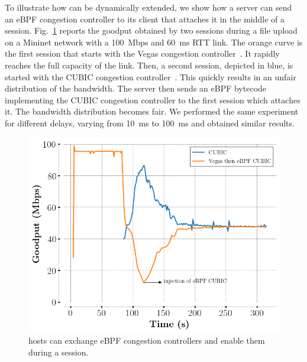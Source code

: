 To illustrate how \tcpls can be dynamically extended, we show how a server can
send an eBPF congestion controller to its client that attaches it in the middle
of a \tcpls session. Fig.~\ref{fig:vegasCubic} reports the goodput obtained
by two \tcpls sessions during a file upload on a Mininet network with a
100~Mbps and 60~ms RTT link.
The orange curve is the first \tcpls session that starts with the Vegas
congestion controller~\cite{brakmo1994tcp}. It rapidly reaches the full capacity of the link. Then, a second \tcpls session, depicted in blue, is
started with the CUBIC congestion controller~\cite{rfc8312}. This quickly
results in an unfair distribution of the bandwidth. The server then sends an
eBPF bytecode implementing the CUBIC congestion controller to the first \tcpls
session which attaches it. The bandwidth distribution becomes fair. We
performed the same experiment for different delays, varying from 10~ms to 100~ms
and obtained similar results.

\begin{figure}[!t]
  \begin{center}
    \includegraphics[width=.8\columnwidth]{pretty_plotify/plots/vegas_cubic.png}
  \end{center}
  \caption{\tcpls hosts can exchange eBPF congestion controllers and enable
  them during a \tcpls session.}
  \label{fig:vegasCubic}
\end{figure}
